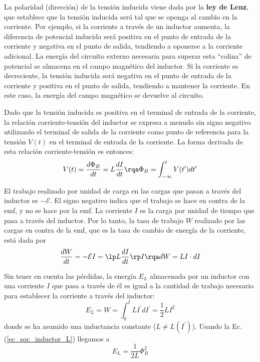     La polaridad (dirección) de la tensión inducida viene dada por la \textbf{ley de Lenz}, que establece que la tensión inducida será tal que se oponga al cambio en la corriente. Por ejemplo, si la corriente a través de un inductor aumenta, la diferencia de potencial inducida será positiva en el punto de entrada de la corriente y negativa en el punto de salida, tendiendo a oponerse a la corriente adicional. La energía del circuito externo necesaria para superar esta ``colina'' de potencial se almacena en el campo magnético del inductor. Si la corriente es decreciente, la tensión inducida será negativa en el punto de entrada de la corriente y positiva en el punto de salida, tendiendo a mantener la corriente. En este caso, la energía del campo magnético se devuelve al circuito.

    Dado que la tensión inducida es positiva en el terminal de entrada de la corriente, la relación corriente-tensión del inductor se expresa a menudo sin signo negativo utilizando el terminal de salida de la corriente como punto de referencia para la tensión $V(t)$ en el terminal de entrada de la corriente. La forma derivada de esta relación corriente-tensión es entonces:
    \begin{equation} \label{ec_sqc_inductor_V_flux}
        V(t) = \frac{d \Phi_B}{dt} = L \frac{dI}{dt}
        \rqa 
        \Phi_B = \int_{-\infty}^t V(t')  dt'
    \end{equation}
    

    El trabajo realizado por unidad de carga en las cargas que pasan a través del inductor es $-\mathcal{E}$. El signo negativo indica que el trabajo se hace en contra de la emf, y no se hace por la emf. La corriente $I$ es la carga por unidad de tiempo que pasa a través del inductor. Por lo tanto, la tasa de trabajo $W$ realizado por las cargas en contra de la emf, que es la tasa de cambio de energía de la corriente, está dada por
    \begin{equation} 
        \frac{dW}{dt} = - \mathcal{E} I = \lp L \frac{dI}{dt} \rp I 
        \rqa
        dW = LI \cdot dI
    \end{equation}

    Sin tener en cuenta las pérdidas, la energía $E_L$ almacenada por un inductor con una corriente $I$ que pasa a través de él es igual a la cantidad de trabajo necesario para establecer la corriente a través del inductor:
    \begin{equation}
        E_L = W = \int_0^{I} L I^{'} dI^{'} = \frac{1}{2} L I^2 
    \end{equation}
    donde se ha asumido una inductancia constante ($L \neq L(I^{'})$). Usando la Ec. (\ref{ec_sqc_inductor_L}) llegamos a
    \begin{equation}  \label{ec_sqc_Inductor_E}
        E_L = \frac{1}{2L} \Phi_B^2
    \end{equation}

